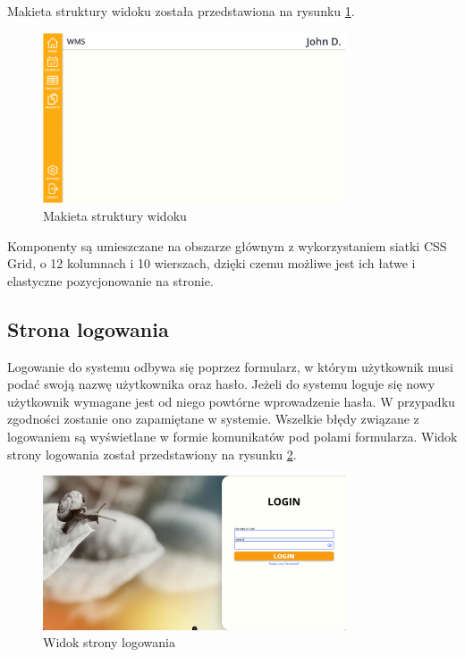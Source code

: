 Makieta struktury widoku została przedstawiona na rysunku \ref{fig:layout}.

\begin{figure}[H]
    \centering
    \includegraphics[width=0.8\textwidth, frame]{graf/front/layoutMockup.png}
    \caption{Makieta struktury widoku}
    \label{fig:layout}
\end{figure}

Komponenty są umieszczane na obszarze głównym z wykorzystaniem siatki CSS Grid, o 12 kolumnach i 10 wierszach, dzięki czemu możliwe jest ich łatwe i elastyczne pozycjonowanie na stronie.

\subsection{Strona logowania}

Logowanie do systemu odbywa się poprzez formularz, w którym użytkownik musi podać swoją nazwę użytkownika oraz hasło. Jeżeli do systemu loguje się nowy użytkownik wymagane jest od niego powtórne wprowadzenie hasła. W przypadku zgodności zostanie ono zapamiętane w systemie. Wszelkie błędy związane z logowaniem są wyświetlane w formie komunikatów pod polami formularza. Widok strony logowania został przedstawiony na rysunku \ref{fig:loginPage}.

\begin{figure}[H]
    \centering
    \includegraphics[width=0.8\textwidth, frame]{graf/front/loginPage.png}
    \caption{Widok strony logowania}
    \label{fig:loginPage}
\end{figure}

